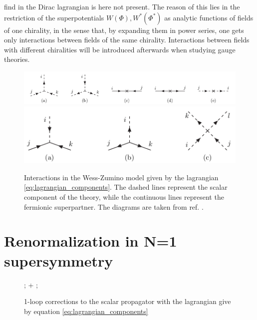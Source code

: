 \documentclass[12pt]{article}
\begin{document}
find in the Dirac lagrangian is here not present. The reason of this lies in the restriction of the superpotentials $W(\Phi), W^*(\Phi^*)$ as analytic functions of fields of one chirality, in the sense that, by expanding them in power series, one gets only interactions between fields of the same chirality. Interactions between fields with different chiralities will be introduced afterwards when studying gauge theories.
\begin{figure}[h]
  \centering 
  \includegraphics[scale=0.3]{images/feynman1.png}
  \includegraphics[scale=0.3]{images/feynman2.png}
  \caption{Interactions in the Wess-Zumino model given by the lagrangian \ref{eq:lagrangian_components}. The dashed lines represent the scalar component of the theory, while the continuous lines represent the fermionic superpartner. The diagrams are taken from ref. \cite{Signer_2009}.}
  \label{fig:WZ_interactions}
\end{figure}
\par 

\newpage

\section{Renormalization in N=1 supersymmetry}

\begin{figure}[h]
  \centering
  ; 
\quad + \qquad
{};
\caption{1-loop corrections to the scalar propagator with the lagrangian give by equation \ref{eq:lagrangian_components}}
\label{fig:scalar_mass_renormalization}
\end{figure}
\end{document}
